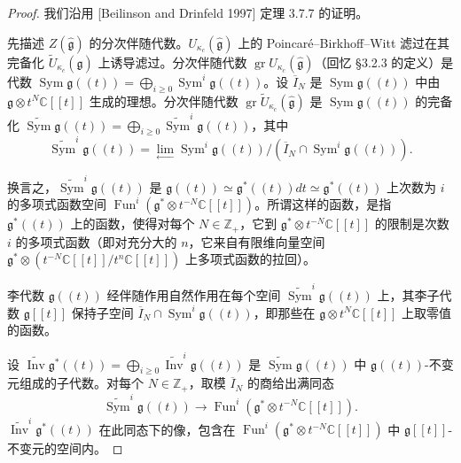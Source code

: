 \begin{proof}
我们沿用 [Beilinson and Drinfeld 1997] 定理 3.7.7 的证明。

先描述 $Z(\hat{\mathfrak{g}})$ 的分次伴随代数。$U_{\kappa_c}(\hat{\mathfrak{g}})$ 上的 Poincaré--Birkhoff--Witt 滤过在其完备化 $\widetilde{U}_{\kappa_c}(\hat{\mathfrak{g}})$ 上诱导滤过。分次伴随代数 $\operatorname{gr}U_{\kappa_c}(\hat{\mathfrak{g}})$（回忆 §3.2.3 的定义）是代数 $\operatorname{Sym}\mathfrak{g}((t))=\bigoplus_{i\ge0}\operatorname{Sym}^i\mathfrak{g}((t))$。设 $\overline{I}_N$ 是 $\operatorname{Sym}\mathfrak{g}((t))$ 中由 $\mathfrak{g}\otimes t^N\mathbb{C}[[t]]$ 生成的理想。分次伴随代数 $\operatorname{gr}\widetilde{U}_{\kappa_c}(\hat{\mathfrak{g}})$ 是 $\operatorname{Sym}\mathfrak{g}((t))$ 的完备化 $\widetilde{\operatorname{Sym}}\mathfrak{g}((t))=\bigoplus_{i\ge0}\widetilde{\operatorname{Sym}}^i\mathfrak{g}((t))$，其中
\[
    \widetilde{\operatorname{Sym}}^i\mathfrak{g}((t))=\lim_{\longleftarrow}\operatorname{Sym}^i\mathfrak{g}((t))/\left(\overline{I}_N\cap\operatorname{Sym}^i\mathfrak{g}((t))\right).
\]

换言之，$\widetilde{\operatorname{Sym}}^i\mathfrak{g}((t))$ 是 $\mathfrak{g}((t))\simeq\mathfrak{g}^*((t))dt\simeq\mathfrak{g}^*((t))$ 上次数为 $i$ 的多项式函数空间 $\operatorname{Fun}^i(\mathfrak{g}^*\otimes t^{-N}\mathbb{C}[[t]])$。所谓这样的函数，是指 $\mathfrak{g}^*((t))$ 上的函数，使得对每个 $N\in\mathbb{Z}_+$，它到 $\mathfrak{g}^*\otimes t^{-N}\mathbb{C}[[t]]$ 的限制是次数 $i$ 的多项式函数（即对充分大的 $n$，它来自有限维向量空间 $\mathfrak{g}^*\otimes(t^{-N}\mathbb{C}[[t]]/t^n\mathbb{C}[[t]])$ 上多项式函数的拉回）。

李代数 $\mathfrak{g}((t))$ 经伴随作用自然作用在每个空间 $\widetilde{\operatorname{Sym}}^i\mathfrak{g}((t))$ 上，其李子代数 $\mathfrak{g}[[t]]$ 保持子空间 $\overline{I}_N\cap\operatorname{Sym}^i\mathfrak{g}((t))$，即那些在 $\mathfrak{g}\otimes t^N\mathbb{C}[[t]]$ 上取零值的函数。

设 $\widetilde{\operatorname{Inv}}\mathfrak{g}^*((t))=\bigoplus_{i\ge0}\widetilde{\operatorname{Inv}}^i\mathfrak{g}((t))$ 是 $\widetilde{\operatorname{Sym}}\mathfrak{g}((t))$ 中 $\mathfrak{g}((t))$-不变元组成的子代数。对每个 $N\in\mathbb{Z}_+$，取模 $\overline{I}_N$ 的商给出满同态
\[
    \widetilde{\operatorname{Sym}}^i\mathfrak{g}((t))\longrightarrow\operatorname{Fun}^i(\mathfrak{g}^*\otimes t^{-N}\mathbb{C}[[t]]).
\]
$\widetilde{\operatorname{Inv}}^i\mathfrak{g}^*((t))$ 在此同态下的像，包含在 $\operatorname{Fun}^i(\mathfrak{g}^*\otimes t^{-N}\mathbb{C}[[t]])$ 中 $\mathfrak{g}[[t]]$-不变元的空间内。


\end{proof}
